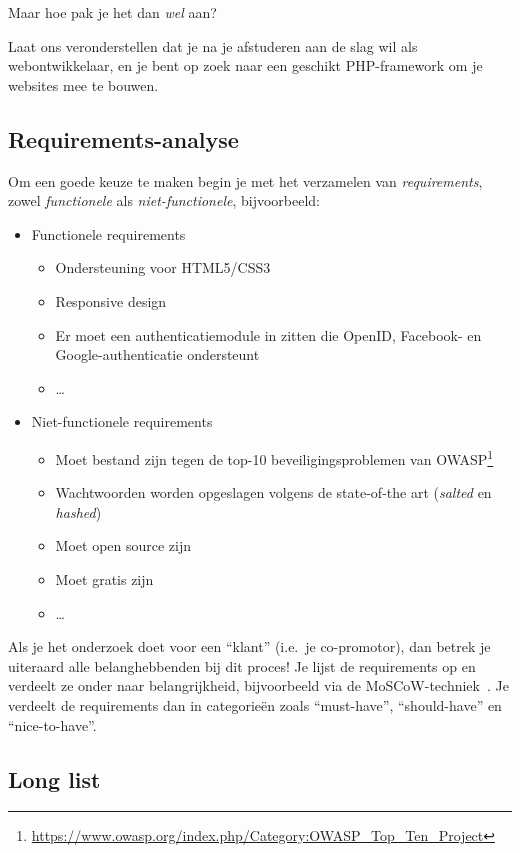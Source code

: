 Maar hoe pak je het dan \emph{wel} aan?

Laat ons veronderstellen dat je na je afstuderen aan de slag wil als webontwikkelaar, en je bent op zoek naar een geschikt PHP-framework om je websites mee te bouwen.

\subsection{Requirements-analyse}%
\label{ssec:requirements-analyse}

Om een goede keuze te maken begin je met het verzamelen van \emph{requirements}, zowel \textit{functionele} als \emph{niet-functionele}, bijvoorbeeld:

\begin{itemize}
\item Functionele requirements
  \begin{itemize}
  \item Ondersteuning voor HTML5/CSS3
  \item Responsive design
  \item Er moet een authenticatiemodule in zitten die OpenID, Facebook- en Goo\-gle-authenticatie ondersteunt
  \item \ldots
  \end{itemize}
\item Niet-functionele requirements
  \begin{itemize}
  \item Moet bestand zijn tegen de top-10 beveiligingsproblemen van OWASP\footnote{\url{https://www.owasp.org/index.php/Category:OWASP_Top_Ten_Project}}
  \item Wachtwoorden worden opgeslagen volgens de state-of-the art (\emph{salted} en \emph{hashed})
  \item Moet open source zijn
  \item Moet gratis zijn
  \item \ldots
  \end{itemize}
\end{itemize}

Als je het onderzoek doet voor een ``klant'' (i.e.\ je co-promotor), dan betrek je uiteraard alle belanghebbenden bij dit proces! Je lijst de requirements op en verdeelt ze onder naar belangrijkheid, bijvoorbeeld via de MoSCoW-techniek~\parencite{Nordenstam2014}. Je verdeelt de requirements dan in categorieën zoals ``must-have'', ``should-have'' en ``nice-to-have''.

\subsection{Long list}%
\label{ssec:long-list}

